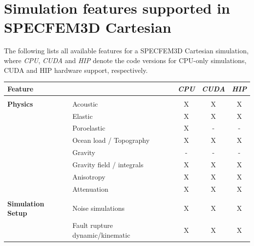 \chapter*{Simulation features supported in SPECFEM3D Cartesian}

The following lists all available features for a SPECFEM3D Cartesian simulation,
where {\it CPU}, {\it CUDA} and {\it HIP} denote the code versions for CPU-only simulations,
CUDA and HIP hardware support, respectively.
%
\begin{table}[htp]
\vspace{-1cm}
\label{table:features}
\begin{center}
\begin{tabular}{ l l c c c}
\hline
{\bf Feature}   &   & {\it CPU} & {\it CUDA} & {\it HIP} \\
\hline
& & & & \\
{\bf Physics}   & Acoustic                        & X  & X  & X \\
                & Elastic                         & X  & X  & X \\
                & Poroelastic                     & X  & -  & - \\
                & Ocean load / Topography         & X  & X  & X \\
                & Gravity                         & -  & -  & - \\
                & Gravity field / integrals       & X  & X  & X \\
                & Anisotropy                      & X  & X  & X \\
                & Attenuation                     & X  & X  & X \\
\hline
& & & & \\
{\bf Simulation Setup}  & Noise simulations                 & X  & X  & X \\
                        & Fault rupture dynamic/kinematic   & X  & X  & X \\

\end{tabular}
\end{center}
\end{table}
